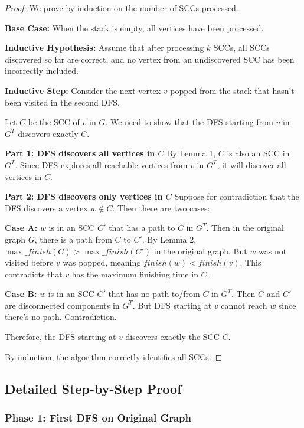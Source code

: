 \documentclass{book}
\theoremstyle{definition}
\begin{document}
\begin{proof}
We prove by induction on the number of SCCs processed.

\textbf{Base Case:} When the stack is empty, all vertices have been processed.

\textbf{Inductive Hypothesis:} Assume that after processing $k$ SCCs, all SCCs discovered so far are correct, and no vertex from an undiscovered SCC has been incorrectly included.

\textbf{Inductive Step:} Consider the next vertex $v$ popped from the stack that hasn't been visited in the second DFS.

Let $C$ be the SCC of $v$ in $G$. We need to show that the DFS starting from $v$ in $G^T$ discovers exactly $C$.

\textbf{Part 1: DFS discovers all vertices in $C$}
By Lemma 1, $C$ is also an SCC in $G^T$. Since DFS explores all reachable vertices from $v$ in $G^T$, it will discover all vertices in $C$.

\textbf{Part 2: DFS discovers only vertices in $C$}
Suppose for contradiction that the DFS discovers a vertex $w \notin C$. Then there are two cases:

\textbf{Case A:} $w$ is in an SCC $C'$ that has a path to $C$ in $G^T$. Then in the original graph $G$, there is a path from $C$ to $C'$. By Lemma 2, $\max\_finish(C) > \max\_finish(C')$ in the original graph. But $w$ was not visited before $v$ was popped, meaning $finish(w) < finish(v)$. This contradicts that $v$ has the maximum finishing time in $C$.

\textbf{Case B:} $w$ is in an SCC $C'$ that has no path to/from $C$ in $G^T$. Then $C$ and $C'$ are disconnected components in $G^T$. But DFS starting at $v$ cannot reach $w$ since there's no path. Contradiction.

Therefore, the DFS starting at $v$ discovers exactly the SCC $C$.

By induction, the algorithm correctly identifies all SCCs.
\end{proof}

\newpage
\subsection{Detailed Step-by-Step Proof}

\subsubsection{Phase 1: First DFS on Original Graph}
\end{document}
